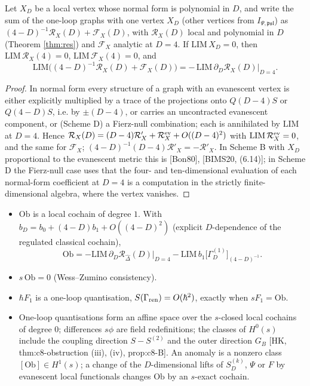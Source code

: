 \begin{lemma}
\label{lem:bonneau}
Let $X_D$ be a local vertex whose normal form is polynomial in $D$, and write the sum of the one-loop graphs with one vertex $X_D$ (other vertices from $I_{\Psi,\mathfrak{psl}}$) as $(4-D)^{-1}\mathcal R_X(D)+\mathcal F_X(D)$, with $\mathcal R_X(D)$ local and polynomial in $D$ (Theorem \ref{thm:res}) and $\mathcal F_X$ analytic at $D=4$. If $\mathrm{LIM}\,X_D=0$, then $\mathrm{LIM}\,\mathcal R_X(4)=0$, $\mathrm{LIM}\,\mathcal F_X(4)=0$, and
\[
\mathrm{LIM}\Big((4-D)^{-1}\mathcal R_X(D)+\mathcal F_X(D)\Big)=-\,\mathrm{LIM}\,\partial_D\mathcal R_X(D)\big|_{D=4}.
\]
\end{lemma}

\begin{proof}
In normal form every structure of a graph with an evanescent vertex is either explicitly multiplied by a trace of the projections onto $Q(D{-}4)S$ or $Q(4{-}D)S$, i.e. by $\pm(D-4)$, or carries an uncontracted evanescent component, or (Scheme D) a Fierz-null combination; each is annihilated by $\mathrm{LIM}$ at $D=4$. Hence $\mathcal R_X(D)=(D-4)\mathcal R'_X+\mathcal R^{\rm ev}_X+O((D-4)^2)$ with $\mathrm{LIM}\,\mathcal R^{\rm ev}_X=0$, and the same for $\mathcal F_X$; $(4-D)^{-1}(D-4)\mathcal R'_X=-\mathcal R'_X$. In Scheme B with $X_D$ proportional to the evanescent metric this is [Bon80], [BIMS20, (6.14)]; in Scheme D the Fierz-null case uses that the four- and ten-dimensional evaluation of each normal-form coefficient at $D=4$ is a computation in the strictly finite-dimensional algebra, where the vertex vanishes.
\end{proof}

\begin{theorem}
\label{thm:obs}
\mbox{}\begin{itemize}
\item[(i)] $\mathrm{Ob}$ is a local cochain of degree $1$. With $b_D=b_0+(4-D)b_1+O((4-D)^2)$ (explicit $D$-dependence of the regulated classical cochain),
\[
\mathrm{Ob}=-\mathrm{LIM}\,\partial_D\mathcal R_{\widehat\Delta}(D)\big|_{D=4}-\mathrm{LIM}\,b_1\big[\Gamma^{(1)}_D\big]_{(4-D)^{-1}}.
\]
\item[(ii)] $s\,\mathrm{Ob}=0$ (Wess--Zumino consistency).
\item[(iii)] $\hbar F_1$ is a one-loop quantisation, $S(\Gamma_{\rm ren})=O(\hbar^2)$, exactly when $sF_1=\mathrm{Ob}$.
\item[(iv)] One-loop quantisations form an affine space over the $s$-closed local cochains of degree $0$; differences $s\phi$ are field redefinitions; the classes of $H^0(s)$ include the coupling direction $S-S^{(2)}$ and the outer direction $G_B$ [HK, thm:c8-obstruction (iii), (iv), prop:c8-B]. An anomaly is a nonzero class $[\mathrm{Ob}]\in H^1(s)$; a change of the $D$-dimensional lifts of $S^{(k)}_D$, $\Psi$ or $F$ by evanescent local functionals changes $\mathrm{Ob}$ by an $s$-exact cochain.
\end{itemize}
\end{theorem}

